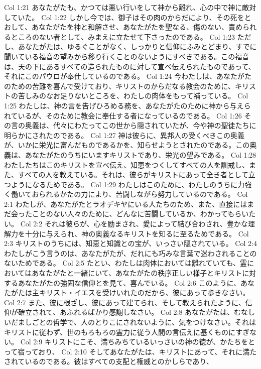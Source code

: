 Col 1:21  あなたがたも、かつては悪い行いをして神から離れ、心の中で神に敵対していた。
Col 1:22  しかし今では、御子はその肉のからだにより、その死をとおして、あなたがたを神と和解させ、あなたがたを聖なる、傷のない、責められるところのない者として、みまえに立たせて下さったのである。
Col 1:23  ただし、あなたがたは、ゆるぐことがなく、しっかりと信仰にふみとどまり、すでに聞いている福音の望みから移り行くことのないようにすべきである。この福音は、天の下にあるすべての造られたものに対して宣べ伝えられたものであって、それにこのパウロが奉仕しているのである。
Col 1:24  今わたしは、あなたがたのための苦難を喜んで受けており、キリストのからだなる教会のために、キリストの苦しみのなお足りないところを、わたしの肉体をもって補っている。
Col 1:25  わたしは、神の言を告げひろめる務を、あなたがたのために神から与えられているが、そのために教会に奉仕する者になっているのである。
Col 1:26  その言の奥義は、代々にわたってこの世から隠されていたが、今や神の聖徒たちに明らかにされたのである。
Col 1:27  神は彼らに、異邦人の受くべきこの奥義が、いかに栄光に富んだものであるかを、知らせようとされたのである。この奥義は、あなたがたのうちにいますキリストであり、栄光の望みである。
Col 1:28  わたしたちはこのキリストを宣べ伝え、知恵をつくしてすべての人を訓戒し、また、すべての人を教えている。それは、彼らがキリストにあって全き者として立つようになるためである。
Col 1:29  わたしはこのために、わたしのうちに力強く働いておられるかたの力により、苦闘しながら努力しているのである。
Col 2:1  わたしが、あなたがたとラオデキヤにいる人たちのため、また、直接にはまだ会ったことのない人々のために、どんなに苦闘しているか、わかってもらいたい。
Col 2:2  それは彼らが、心を励まされ、愛によって結び合わされ、豊かな理解力を十分に与えられ、神の奥義なるキリストを知るに至るためである。
Col 2:3  キリストのうちには、知恵と知識との宝が、いっさい隠されている。
Col 2:4  わたしがこう言うのは、あなたがたが、だれにも巧みな言葉で迷わされることのないためである。
Col 2:5  たとい、わたしは肉体においては離れていても、霊においてはあなたがたと一緒にいて、あなたがたの秩序正しい様子とキリストに対するあなたがたの強固な信仰とを見て、喜んでいる。
Col 2:6  このように、あなたがたは主キリスト・イエスを受けいれたのだから、彼にあって歩きなさい。
Col 2:7  また、彼に根ざし、彼にあって建てられ、そして教えられたように、信仰が確立されて、あふれるばかり感謝しなさい。
Col 2:8  あなたがたは、むなしいだましごとの哲学で、人のとりこにされないように、気をつけなさい。それはキリストに従わず、世のもろもろの霊力に従う人間の言伝えに基くものにすぎない。
Col 2:9  キリストにこそ、満ちみちているいっさいの神の徳が、かたちをとって宿っており、
Col 2:10  そしてあなたがたは、キリストにあって、それに満たされているのである。彼はすべての支配と権威とのかしらであり、
